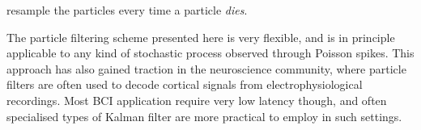 resample the particles every time a particle \emph{dies}.\par
The particle filtering scheme presented here is very flexible, and is in principle applicable to any kind of stochastic process observed through Poisson spikes. This
approach has also gained traction in the neuroscience community, where particle filters are often used to decode cortical signals from electrophysiological recordings.
\cite{brockwell2004recursive,Ergun2007} Most BCI application require very low latency though, and often specialised types of Kalman filter are more practical to employ in such settings.\cite{wu2006bayesian}



